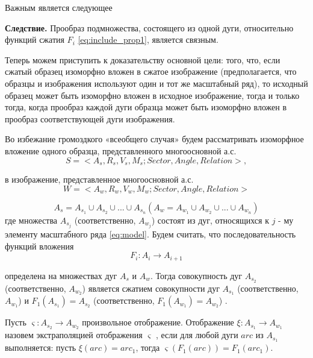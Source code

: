 Важным является следующее  
       
\textbf{Следствие.}
Прообраз  подмножества, состоящего из одной дуги, относительно функций сжатия  $F_i$ \ref{eq:include_prop1}, является связным.

Теперь можем приступить  к доказательству основной цели: того, что, если сжатый образец изоморфно вложен в сжатое изображение (предполагается, что образцы и изображения используют один и тот же масштабный ряд), то исходный  образец может быть изоморфно вложен в исходное изображение, тогда и только тогда, когда прообраз каждой дуги образца может быть изоморфно вложен в прообраз соответствующей дуги изображения.

Во избежание громоздкого «всеобщего случая» будем рассматривать изоморфное вложение одного образца, представленного многоосновной  а.с.  
\begin{equation}
S  = < A_s, R_s, V_s, M_s; Sector, Angle, Relation >,                     %
\label{scale:9}
\end{equation}
          
в изображение,  представленное многоосновной а.с.  
\begin{equation}
W  = < A_w, R_w, V_w, M_w; Sector,  Angle, Relation >                     %
\label{scale:10}
\end{equation}

\begin{equation}
A_s = A_{s_1} \cup A_{s_2} \cup ... \cup A_{s_n}  (A_w = A_{w_1} \cup A_{w_2} \cup ... \cup A_{w_n})                     %
\label{scale:11}
\end{equation}
где  множества   $A_{s_j}$ (соответственно,  $A_{w_j}$) состоят из дуг, относящихся к $j$ - му элементу   масштабного ряда \ref{eq:model}. 
Будем считать, что последовательность функций вложения  
\begin{equation}
F_i : A_i \to A_{i+1}  %
\label{scale:12}
\end{equation}

определена на множествах дуг $A_s$  и $A_w$.  Тогда совокупность дуг $A_{s_2}$ (соответственно,  $A_{w_2}$) является  сжатием   совокупности дуг   $A_{s_1}$ (соответственно,  $A_{w_1}$)    и  $F_1 ( A_{s_1})  =  A_{s_2}$ (соответственно,  $F_1 ( A_{w_1} )  =  A_{w_2}$) .  

\begin{definition}
Пусть $\varsigma : A_{s_2} \to A_{w_2}$  произвольное отображение. Отображение $\xi : A_{s_1} \to A_{w_1}$ назовем экстраполяцией отображения $\varsigma$ , если для любой дуги   $arc$  из $A_{s_1}$ выполняется:  пусть $\xi(arc)  =  arc_1$,   тогда  $\varsigma (F_1(arc) )  =  F_1(arc_1)$. 
\end{definition}
          
